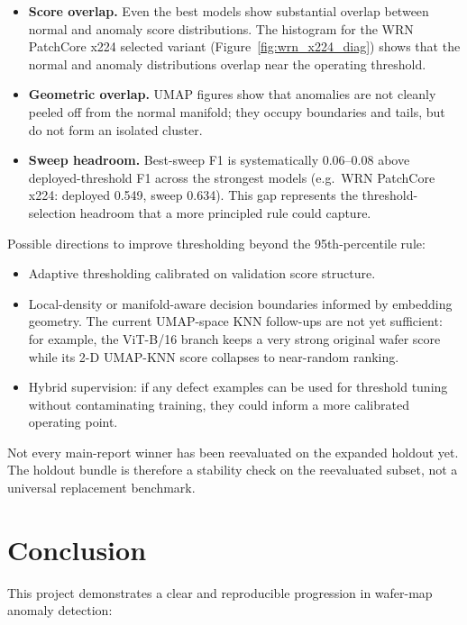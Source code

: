 \documentclass[11pt]{article}
\begin{document}
\begin{itemize}[leftmargin=1.5em]
  \item \textbf{Score overlap.} Even the best models show substantial overlap
        between normal and anomaly score distributions.  The histogram for
        the WRN PatchCore x224 selected variant (Figure~\ref{fig:wrn_x224_diag})
        shows that the normal and anomaly distributions overlap near the
        operating threshold.
  \item \textbf{Geometric overlap.} UMAP figures show that anomalies are not
        cleanly peeled off from the normal manifold; they occupy boundaries
        and tails, but do not form an isolated cluster.
  \item \textbf{Sweep headroom.} Best-sweep F1 is systematically $0.06$--$0.08$
        above deployed-threshold F1 across the strongest models (e.g.\ WRN
        PatchCore x224: deployed 0.549, sweep 0.634).  This gap represents
        the threshold-selection headroom that a more principled rule could capture.
\end{itemize}

Possible directions to improve thresholding beyond the 95th-percentile rule:
\begin{itemize}[leftmargin=1.5em]
  \item Adaptive thresholding calibrated on validation score structure.
  \item Local-density or manifold-aware decision boundaries informed by embedding geometry.
        The current UMAP-space KNN follow-ups are not yet sufficient:
        for example, the ViT-B/16 branch keeps a very strong original wafer
        score while its 2-D UMAP-KNN score collapses to near-random ranking.
  \item Hybrid supervision: if any defect examples can be used for threshold tuning
        without contaminating training, they could inform a more calibrated operating point.
\end{itemize}

Not every main-report winner has been reevaluated on the expanded holdout yet.
The holdout bundle is therefore a stability check on the reevaluated subset,
not a universal replacement benchmark.

\section{Conclusion}

This project demonstrates a clear and reproducible progression in wafer-map
anomaly detection:
\end{document}
